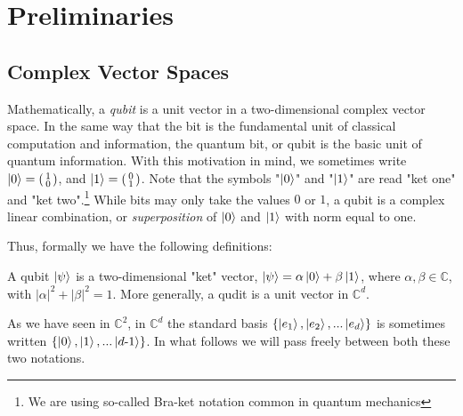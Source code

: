 
\chapter{Preliminaries} %

\label{Chapter2-preliminaries} %


\section{Complex Vector Spaces} \label{section:complex vector space}

Mathematically, a {\emph{qubit}} is a unit vector in a two-dimensional complex vector space.  In the same way that the bit is the fundamental unit of classical computation and information, the quantum bit, or qubit is the basic unit of quantum information.  With this motivation in mind, we sometimes write $\ket{0} = \left(\begin{smallmatrix}1\\0\end{smallmatrix}\right)$, and $\ket{1} = \left(\begin{smallmatrix}0\\1\end{smallmatrix}\right)$. Note that the symbols "$\ket{0}$" and "$\ket{1}$" are read "ket one" and "ket two".\footnote{We are using so-called Bra-ket notation common in quantum mechanics}  While bits may only take the values $0$ or $1$, a qubit is a complex linear combination, or \textit{superposition} of $\ket{0}$ and $\ket{1}$ with norm equal to one. 

Thus, formally we have the following definitions:
\begin{definition}[Qubit]
\label{def qubit}
A qubit $\ket{\psi}$ is a two-dimensional "ket" vector, $\ket{\psi}=\alpha\ket{0}+\beta\ket{1}$, 
where $\alpha,\beta\in\mathbb{C}$, with $|\alpha|^2+|\beta|^2=1$.
More generally, a qudit is a unit vector in ${\mathbb{C}}^d$.
\end{definition}



As we have seen in ${\mathbb{C}}^2$, in ${\mathbb{C}}^d$ the standard basis $\{\ket{e_1}, \ket{e_2}, ... \ket{e_d} \}$ is sometimes written $\{\ket{0}, \ket{1}, ...\ket{d\textrm{-}1}\}$.  In what follows we will pass freely between both these two notations.



